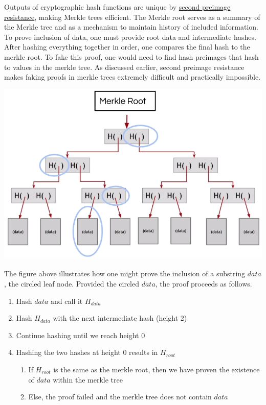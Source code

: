 \documentclass[full.tex]{subfiles}
\begin{document}
 Outputs of cryptographic hash functions are unique by \underline{second preimage resistance}, making Merkle trees efficient. The Merkle root serves as a summary of the Merkle tree and as a mechanism to maintain history of included information. To prove inclusion of data, one must provide root data and intermediate hashes. After hashing everything together in order, one compares the final hash to the merkle root. To fake this proof, one would need to find hash preimages that hash to values in the merkle tree. As discussed earlier, second preimage resistance makes faking proofs in merkle trees extremely difficult and practically impossible.
 \begin{center}
 \includegraphics[scale=0.4]{merkle_proof}
 \end{center}
 \medskip
 
 The figure above illustrates how one might prove the inclusion of a substring $data$, the circled leaf node. Provided the circled $data$, the proof proceeds as follows.
 
 \begin{enumerate}
     \item Hash $data$ and call it $H_{data}$
     \item Hash $H_{data}$ with the next intermediate hash (height 2)
     \item Continue hashing until we reach height 0
     \item Hashing the two hashes at height 0 results in $H_{root}$
     \begin{enumerate}
         \item If $H_{root}$ is the same as the merkle root, then we have proven the existence of $data$ within the merkle tree
         \item Else, the proof failed and the merkle tree does not contain $data$
     \end{enumerate}
 \end{enumerate}
 
\end{document}
